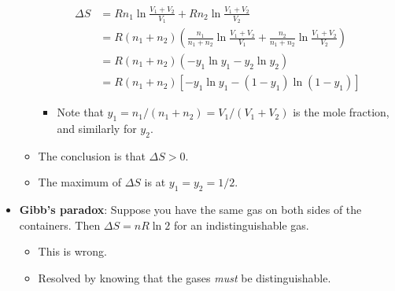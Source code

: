 \documentclass[../notes.tex]{subfiles}
\begin{document}
\begin{itemize}
\begin{itemize}
\begin{align*}
            \Delta S &= Rn_1\ln\frac{V_1+V_2}{V_1}+Rn_2\ln\frac{V_1+V_2}{V_2}\\
            &= R(n_1+n_2)\left( \frac{n_1}{n_1+n_2}\ln\frac{V_1+V_2}{V_1}+\frac{n_2}{n_1+n_2}\ln\frac{V_1+V_2}{V_2} \right)\\
            &= R(n_1+n_2)(-y_1\ln y_1-y_2\ln y_2)\\
            &= R(n_1+n_2)[-y_1\ln y_1-(1-y_1)\ln(1-y_1)]
        \end{align*}
        \begin{itemize}
            \item Note that $y_1=n_1/(n_1+n_2)=V_1/(V_1+V_2)$ is the mole fraction, and similarly for $y_2$.
        \end{itemize}
        \item The conclusion is that $\Delta S>0$.
        \item The maximum of $\Delta S$ is at $y_1=y_2=1/2$.
    \end{itemize}
    \item \textbf{Gibb's paradox}: Suppose you have the same gas on both sides of the containers. Then $\Delta S=nR\ln 2$ for an indistinguishable gas.
    \begin{itemize}
        \item This is wrong.
        \item Resolved by knowing that the gases \emph{must} be distinguishable.
    \end{itemize}
\end{itemize}
\end{document}

